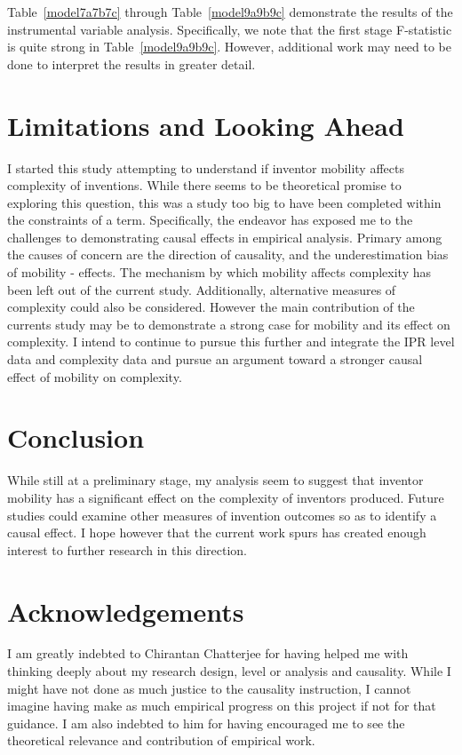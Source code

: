 \documentclass[12pt]{article}
\begin{document}
Table~\ref{model7a7b7c} through Table~\ref{model9a9b9c} demonstrate the results of the instrumental variable analysis. Specifically, we note that the first stage F-statistic is quite strong in Table~\ref{model9a9b9c}. However, additional work may need to be done to interpret the results in greater detail.


\section{Limitations and Looking Ahead}
I started this study attempting to understand if inventor mobility affects complexity of inventions. While there seems to be theoretical promise to exploring this question, this was a study too big to have been completed within the constraints of a term. Specifically, the endeavor has exposed me to the challenges to demonstrating causal effects in empirical analysis. Primary among the causes of concern are the direction of causality, and the underestimation bias of mobility - effects. The mechanism by which mobility affects complexity has been left out of the current study. Additionally, alternative measures of complexity could also be considered. However the main contribution of the currents study may be to demonstrate a strong case for mobility and its effect on complexity.  I intend to continue to pursue this further and integrate the IPR level data and complexity data and pursue an argument toward a stronger causal effect of mobility on complexity.

\section{Conclusion}
While still at a preliminary stage, my analysis seem to suggest that inventor mobility  has a significant effect on the complexity of inventors produced. Future studies could  examine other measures of invention outcomes so as to identify a causal effect. I hope however that the current work spurs has created enough interest to further research in this direction.


\section*{Acknowledgements}
I am greatly indebted to Chirantan Chatterjee for having helped me with thinking deeply about my research design, level or analysis and causality. While I might have not done as much justice to the causality instruction, I cannot imagine having make as much empirical progress on this project if not for that guidance. I am also indebted to him for having encouraged me to see the theoretical relevance and contribution of empirical work.
\end{document}
